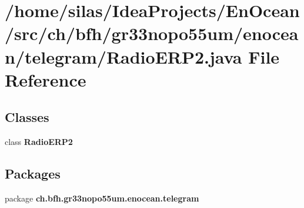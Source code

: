 \section{/home/silas/\+Idea\+Projects/\+En\+Ocean/src/ch/bfh/gr33nopo55um/enocean/telegram/\+Radio\+E\+R\+P2.java File Reference}
\label{RadioERP2_8java}
\subsection*{Classes}
\begin{DoxyCompactItemize}
\item 
class {\bf Radio\+E\+R\+P2}
\end{DoxyCompactItemize}
\subsection*{Packages}
\begin{DoxyCompactItemize}
\item 
package {\bf ch.\+bfh.\+gr33nopo55um.\+enocean.\+telegram}
\end{DoxyCompactItemize}
